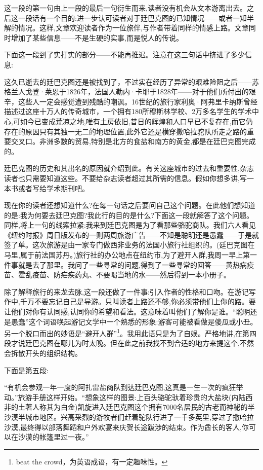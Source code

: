 这一段的第一句由上一段的最后一句衍生而来,读者没有机会从文本游离出去。之后这一段话有一个目的:进一步认可读者对于廷巴克图的已知情况——或者一知半解的情况。这样,文章欢迎读者作为一位旅伴,与作者带着同样的情感上路。文章同时增加了某些信息——不是生硬的实事,而是悦人的传说。

下面这一段到了实打实的部分——不能再推迟。注意在这三句话中挤进了多少信息:

这久已逝去的廷巴克图还是被找到了，不过实在经历了异常的艰难险阻之后——苏格兰人戈登·莱恩于1826年，法国人勒内·卡耶于1828年——对于他们所付出的艰辛，这些人一定会感觉遭到残酷的嘲讽。16世纪的旅行家利奥·阿弗里卡纳斯曾经描述过这座十万人的传奇城市，一个拥有180所穆斯林学校、2万多名学生的学术中心,可如今已变成荒凉之地,唯有土房依旧,昔日的辉煌和人口早已不复存在,而它仍存在的原因只有其独一无二的地理位置,此外它还是横穿撒哈拉驼队所走之路的重要交叉口。非洲多数的贸易,特别是北方的食盐和南方的黄金,都是在廷巴克图完成的。

廷巴克图的历史和其出名的原因就介绍到此。有关这座城市的过去和重要性,杂志读者也只需要知道这些。不要给杂志读者超过其所需的信息。假如你想多讲,写一本书或者写给学术期刊吧。

现在你的读者还想知道什么?在每一句话之后要问自己这个问题。在此他们想知道的是:我为何要去廷巴克图?我此行的目的是什么?下面这一段就解答了这个问题。同样,将上一句的线索拉紧:我来到廷巴克图是为了看那些骆驼商队。我们六人看见《纽约时报》周日版发布的一则两周旅游广告——不知是聪明还是愚蠢——于是就签了单。这次旅游是由一家专门做西非业务的法国小旅行社组织的。(廷巴克图在马里,属于前法国苏丹。)旅行社的办公地点在纽约市,为了避开人群,我周一早上第一件事就是去了那里。我问了一些寻常的问题,得到了一些寻常的回答——黄热病疫苗、霍乱疫苗、防疟疾药丸、不要喝当地的水——然后得到一本小册子。

除了解释旅行的来龙去脉,这一段还做了一件事:引入作者的性格和口吻。在游记写作中,千万不要忘记自己是导游。只叫读者上路还不够,你必须带他们上你的路。要让他们对你有认同感,认同你的希望和看法。这意味着叫他们了解你是谁。“聪明还是愚蠢”这个词语唤起游记文学中一个熟悉的形象:游客可能被看做是傻瓜或小丑。另一个脱口而出的妙语是“避开人群”\footnote{beat the crowd，为英语成语，有一定趣味性。}。我用此语只是为了自娱。严格地讲,在第四段才说廷巴克图在哪儿为时太晚。但在此之前我找不到合适的地方来提这个,不然会拆散开头的组织结构。

下面是第五段:

“有机会参观一年一度的阿扎雷盐商队到达廷巴克图,这真是一生一次的疯狂举动。”旅游手册这样开始。“想象这样的图景:上百头骆驼驮着珍贵的大盐块(内陆西非的土著人称其为白金)凯旋进入廷巴克图这个拥有7000名居民的古老而神秘的半沙漠半城市地区。兴高采烈的游牧者们赶着驼队行进了一千多英里,穿过了撒哈拉沙漠,最终得以部落舞蹈和户外欢宴来庆贺长途跋涉的结束。作为酋长的客人,你可以在沙漠的帐篷里过一夜。”

